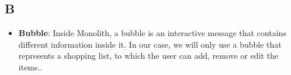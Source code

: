 \subsection*{B}
\begin{itemize}
	\item
	\textbf{Bubble}: Inside Monolith, a bubble is an interactive message that contains different information inside it. In our case, we will only use a bubble that represents a shopping list, to which the user can add, remove or edit the items..
\end{itemize}
\newpage